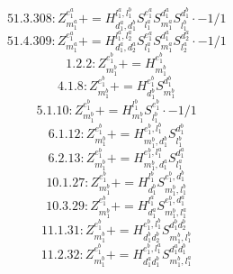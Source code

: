 \documentclass[letterpaper,10pt,fleqn,leqno,onecolumn]{article}
\begin{document}
\begin{equation} \;\;\;\;\;\;  51.3.308: Z^{e_{1}^{a}}_{m_{1}^{a}}+=H^{l_{1}^{a},l_{1}^{b}}_{d_{1}^{a},d_{1}^{b}}S^{e_{1}^{a}}_{l_{1}^{a}}S^{d_{1}^{a}}_{m_{1}^{a}}S^{d_{1}^{b}}_{l_{1}^{b}}\cdot -1/1 \end{equation}
\begin{equation} \;\;\;\;\;\;  51.4.309: Z^{e_{1}^{a}}_{m_{1}^{a}}+=H^{l_{1}^{a},l_{2}^{a}}_{d_{1}^{a},d_{2}^{a}}S^{e_{1}^{a}}_{l_{1}^{a}}S^{d_{1}^{a}}_{m_{1}^{a}}S^{d_{2}^{a}}_{l_{2}^{a}}\cdot -1/1 \end{equation}
\begin{equation} \;\;\;\;\;\;  1.2.2: Z^{e_{1}^{b}}_{m_{1}^{b}}+=H^{e_{1}^{b}}_{m_{1}^{b}} \end{equation}
\begin{equation} \;\;\;\;\;\;  4.1.8: Z^{e_{1}^{b}}_{m_{1}^{b}}+=H^{e_{1}^{b}}_{d_{1}^{b}}S^{d_{1}^{b}}_{m_{1}^{b}} \end{equation}
\begin{equation} \;\;\;\;\;\;  5.1.10: Z^{e_{1}^{b}}_{m_{1}^{b}}+=H^{l_{1}^{b}}_{m_{1}^{b}}S^{e_{1}^{b}}_{l_{1}^{b}}\cdot -1/1 \end{equation}
\begin{equation} \;\;\;\;\;\;  6.1.12: Z^{e_{1}^{b}}_{m_{1}^{b}}+=H^{e_{1}^{b},l_{1}^{b}}_{m_{1}^{b},d_{1}^{b}}S^{d_{1}^{b}}_{l_{1}^{b}} \end{equation}
\begin{equation} \;\;\;\;\;\;  6.2.13: Z^{e_{1}^{b}}_{m_{1}^{b}}+=H^{e_{1}^{b},l_{1}^{a}}_{m_{1}^{b},d_{1}^{a}}S^{d_{1}^{a}}_{l_{1}^{a}} \end{equation}
\begin{equation} \;\;\;\;\;\;  10.1.27: Z^{e_{1}^{b}}_{m_{1}^{b}}+=H^{l_{1}^{b}}_{d_{1}^{b}}S^{e_{1}^{b},d_{1}^{b}}_{m_{1}^{b},l_{1}^{b}} \end{equation}
\begin{equation} \;\;\;\;\;\;  10.3.29: Z^{e_{1}^{b}}_{m_{1}^{b}}+=H^{l_{1}^{a}}_{d_{1}^{a}}S^{e_{1}^{b},d_{1}^{a}}_{m_{1}^{b},l_{1}^{a}} \end{equation}
\begin{equation} \;\;\;\;\;\;  11.1.31: Z^{e_{1}^{b}}_{m_{1}^{b}}+=H^{e_{1}^{b},l_{1}^{b}}_{d_{1}^{b}d_{2}^{b}}S^{d_{1}^{b}d_{2}^{b}}_{m_{1}^{b},l_{1}^{b}} \end{equation}
\begin{equation} \;\;\;\;\;\;  11.2.32: Z^{e_{1}^{b}}_{m_{1}^{b}}+=H^{e_{1}^{b},l_{1}^{a}}_{d_{1}^{a}d_{1}^{b}}S^{d_{1}^{a}d_{1}^{b}}_{m_{1}^{b},l_{1}^{a}} \end{equation}
\end{document}
